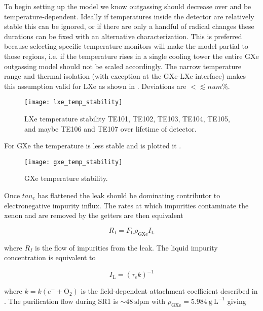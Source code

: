 To begin setting up the model we know outgassing should decrease over and be temperature-dependent.  Ideally if temperatures inside the
detector are relatively stable this can be ignored, or if there are only a handful of radical changes these durations can be fixed with an
alternative characterization.  This is preferred because selecting specific temperature monitors will make the model
partial to those regions, i.e. if the temperature rises in a single cooling tower the entire GXe outgassing model should not be scaled
accordingly.  The narrow temperature range and thermal isolation (with exception at the GXe-LXe interface) makes this assumption valid for
LXe as shown in .  Deviations are $< \lesssim num\%$.

\begin{figure}
\centering
\texttt{[image: lxe\_temp\_stability]}
\caption{LXe temperature stability TE101, TE102, TE103, TE104, TE105, and maybe TE106 and TE107 over lifetime of detector.}
\label{fig:electron_lifetime_model_outgassing_lxe_temp}
\end{figure}

For GXe the temperature is less stable and is plotted it .

\begin{figure}
\centering
\texttt{[image: gxe\_temp\_stability]}
\caption{GXe temperature stability.}
\label{fig:electron_lifetime_model_outgassing_gxe_temp}
\end{figure}

Once $tau_e$ has flattened the leak should be dominating contributor to electronegative impurity influx.  The rates at which impurities
contaminate the xenon and are removed by the getters are then equivalent

\begin{equation}
R_I = F_{\mathrm{L}} \rho_{\mathrm{GXe}} I_{\mathrm{L}}
\end{equation}

\noindent where $R_I$ is the flow of impurities from the leak.  The liquid impurity concentration is equivalent to

\begin{equation}
I_{\mathrm{L}} = ( \tau_e k)^{-1}
\end{equation}

\noindent where $k = k(e^- + \mathrm{O_2})$ is the field-dependent \electron attachment coefficient described in
.  The purification flow during SR1 is ${\sim} 48\ \mathrm{slpm}$ with
$\rho_{\mathrm{GXe}} = 5.984\ \mathrm{g\ L^{-1}}$ giving

